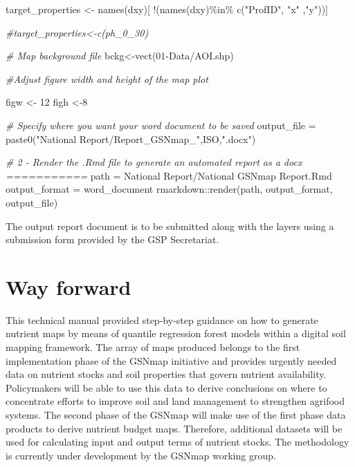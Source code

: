 \documentclass[
  10pt,
  b5paper,
  oneside]{book}
\newenvironment{Shaded}{\begin{snugshade}}{\end{snugshade}}
\newcommand{\CommentTok}[1]{\textcolor[rgb]{0.56,0.35,0.01}{\textit{#1}}}
\newcommand{\DecValTok}[1]{\textcolor[rgb]{0.00,0.00,0.81}{#1}}
\newcommand{\FunctionTok}[1]{\textcolor[rgb]{0.00,0.00,0.00}{#1}}
\newcommand{\NormalTok}[1]{#1}
\newcommand{\OtherTok}[1]{\textcolor[rgb]{0.56,0.35,0.01}{#1}}
\newcommand{\SpecialCharTok}[1]{\textcolor[rgb]{0.00,0.00,0.00}{#1}}
\newcommand{\StringTok}[1]{\textcolor[rgb]{0.31,0.60,0.02}{#1}}
\begin{document}
\begin{Shaded}
\begin{Highlighting}[]
\NormalTok{target\_properties }\OtherTok{\textless{}{-}} \FunctionTok{names}\NormalTok{(dxy)[ }\SpecialCharTok{!}\NormalTok{(}\FunctionTok{names}\NormalTok{(dxy)}\SpecialCharTok{\%in\%} \FunctionTok{c}\NormalTok{(}\StringTok{"ProfID"}\NormalTok{, }\StringTok{"x"}\NormalTok{ ,}\StringTok{"y"}\NormalTok{))]}

\CommentTok{\#target\_properties\textless{}{-}c(\textquotesingle{}ph\_0\_30\textquotesingle{})}

\CommentTok{\# Map background file}
\NormalTok{bckg}\OtherTok{\textless{}{-}}\FunctionTok{vect}\NormalTok{(}\StringTok{\textquotesingle{}01{-}Data/AOI.shp\textquotesingle{}}\NormalTok{)}

\CommentTok{\#Adjust figure width and height of the map plot}

\NormalTok{figw }\OtherTok{\textless{}{-}} \DecValTok{12}
\NormalTok{figh }\OtherTok{\textless{}{-}}\DecValTok{8}


\CommentTok{\# Specify where you want your word document to be saved}
\NormalTok{output\_file }\OtherTok{=} \FunctionTok{paste0}\NormalTok{(}\StringTok{"National Report/Report\_GSNmap\_"}\NormalTok{,ISO,}\StringTok{".docx"}\NormalTok{)}

\CommentTok{\# 2 {-} Render the .Rmd file to generate an automated report as a docx ===========}
\NormalTok{path }\OtherTok{=} \StringTok{\textquotesingle{}National Report/National GSNmap Report.Rmd\textquotesingle{}}
\NormalTok{output\_format }\OtherTok{=} \StringTok{\textquotesingle{}word\_document\textquotesingle{}}
\NormalTok{rmarkdown}\SpecialCharTok{::}\FunctionTok{render}\NormalTok{(path, output\_format, output\_file)}
\end{Highlighting}
\end{Shaded}

The output report document is to be submitted along with the layers using a submission form provided by the GSP Secretariat.

\hypertarget{way-forward}{%
\chapter{Way forward}\label{way-forward}}

This technical manual provided step-by-step guidance on how to generate nutrient maps by means of quantile regression forest models within a digital soil mapping framework. The array of maps produced belongs to the first implementation phase of the GSNmap initiative and provides urgently needed data on nutrient stocks and soil properties that govern nutrient availability. Policymakers will be able to use this data to derive conclusions on where to concentrate efforts to improve soil and land management to strengthen agrifood systems.
The second phase of the GSNmap will make use of the first phase data products to derive nutrient budget maps. Therefore, additional datasets will be used for calculating input and output terms of nutrient stocks. The methodology is currently under development by the GSNmap working group.
\end{document}
